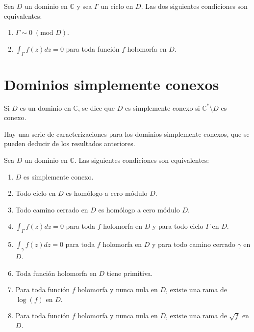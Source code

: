 \begin{theorem}
    Sea $D$ un dominio en $\mathbb{C}$ y sea $\Gamma$ un ciclo en $D$.
    Las dos siguientes condiciones son equivalentes:
    \begin{enumerate}
        \item $\Gamma \sim 0 \; (\text{mod } D)$.
        \item $\int_\Gamma f(z)dz = 0$ para toda función $f$ holomorfa en $D$.
    \end{enumerate}
\end{theorem}

\section{Dominios simplemente conexos}
\begin{definition}
    Si $D$ es un dominio en $\mathbb{C}$, se dice que $D$ es simplemente conexo si $\mathbb{C}^\ast \setminus D$ es conexo.
\end{definition}

Hay una serie de caracterizaciones para los dominios simplemente conexos, que se pueden deducir de los resultados anteriores.

\begin{theorem}
    Sea $D$ un dominio en $\mathbb{C}$.
    Las siguientes condiciones son equivalentes:
    \begin{enumerate}
        \item $D$ es simplemente conexo.
        \item Todo ciclo en $D$ es homólogo a cero módulo $D$.
        \item Todo camino cerrado en $D$ es homólogo a cero módulo $D$.
        \item $\int_\Gamma f(z)dz = 0$ para toda $f$ holomorfa en $D$ y para todo ciclo $\Gamma$ en $D$.
        \item $\int_\gamma f(z)dz = 0$ para toda $f$ holomorfa en $D$ y para todo camino cerrado $\gamma$ en $D$.
        \item Toda función holomorfa en $D$ tiene primitiva.
        \item Para toda función $f$ holomorfa y nunca nula en $D$, existe una rama de $\log(f)$ en $D$.
        \item Para toda función $f$ holomorfa y nunca nula en $D$, existe una rama de $\sqrt{f}$ en $D$.
    \end{enumerate}
\end{theorem}

